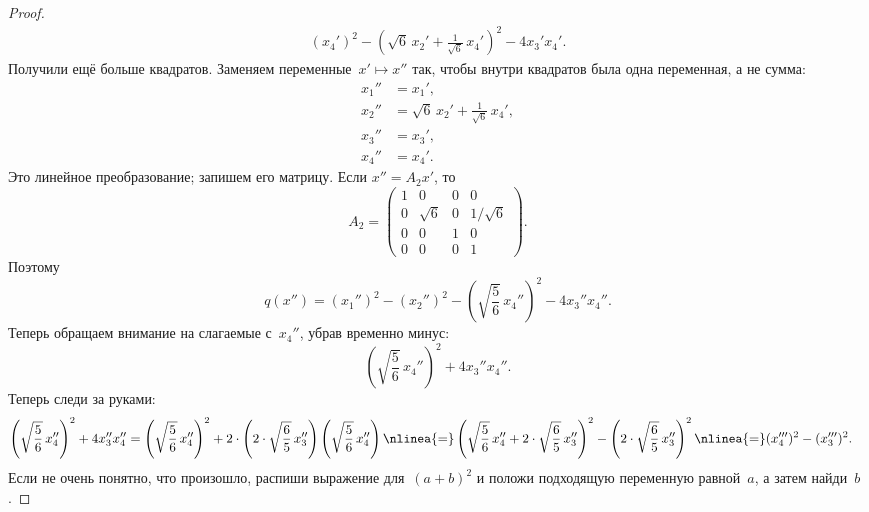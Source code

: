 \begin{proof}
\begin{align*}
		(x_4')^2
		-
		\left( 
			\sqrt{6}\,x_2' +
			\frac{1}{\sqrt{6}}\,x_4'
		\right)^2
		-
		4 x_3' x_4'
		.
	\end{align*}
	Получили ещё больше квадратов. Заменяем переменные~$x' \mapsto x''$ так, чтобы внутри квадратов была одна переменная, а не сумма:
	\begin{align*}
		x_1'' &= x_1',
		\\
		x_2'' &= \sqrt{6}\,x_2' + \frac{1}{\sqrt{6}}\,x_4',
		\\
		x_3'' &= x_3',
		\\
		x_4'' &= x_4'.
	\end{align*}
	Это линейное преобразование; запишем его матрицу. Если $x'' = A_2 x'$, то
	\[
		A_2 =
		\begin{pmatrix}
			1 & 0 & 0 & 0
			\\
			0 & \sqrt{6} & 0 & 1/\sqrt{6}
			\\
			0 & 0 & 1 & 0
			\\
			0 & 0 & 0 & 1
		\end{pmatrix}
		.
	\]
	Поэтому
	\begin{equation}
		\label{eq:num_08:q:x''}
		q(x'') =
		(x_1'')^2
		-
		(x_2'')^2
		-
		\left( 
			\sqrt{\frac{5}{6}}\,x_4''
		\right)^2
		-
		4 x_3'' x_4''
		.
	\end{equation}
	Теперь обращаем внимание на слагаемые с~$x_4''$, убрав временно минус:
	\[
		\left( 
			\sqrt{\frac{5}{6}}\,x_4''
		\right)^2
		+
		4 x_3'' x_4''
		.
	\]
	Теперь следи за руками:
	\begin{align*}
		\left( 
			\sqrt{\frac{5}{6}}\,x_4''
		\right)^2
		+
		4 x_3'' x_4''
		&=
		\left( 
			\sqrt{\frac{5}{6}}\,x_4''
		\right)^2
		+
		2 \cdot
		\left( 
			2 \cdot 
			\sqrt{\frac{6}{5}}
			\,
			x_3''
		\right)
		\left(
			\sqrt{\frac{5}{6}}\, x_4''
		\right)
		\nlinea{=}
		\left( 
			\sqrt{\frac{5}{6}}\,x_4''
			+
			2 \cdot 
			\sqrt{\frac{6}{5}}
			\,
			x_3''
		\right)^2
		-
		\left( 
			2 \cdot 
			\sqrt{\frac{6}{5}}
			\,
			x_3''
		\right)^2
		\nlinea{=}
		(x_4''')^2
		-
		(x_3''')^2
		.
	\end{align*}
	Если не очень понятно, что произошло, распиши выражение для~$(a+b)^2$ и положи подходящую переменную равной~$a$, а затем найди~$b$.


\end{proof}
